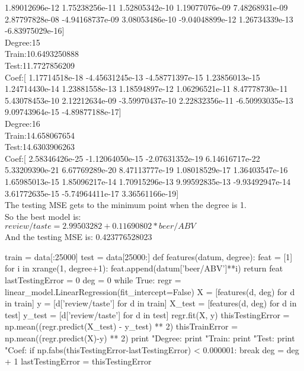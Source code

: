 \documentclass [11pt, a4paper, oneside] {article}
\begin{document}
   1.89012696e-12   1.75238256e-11   1.52805342e-10   1.19077076e-09
   7.48268931e-09   2.87797828e-08  -4.94168737e-09   3.08053486e-10
  -9.04048899e-12   1.26734339e-13  -6.83975029e-16]\\
Degree:15\\
Train:10.6493250888\\
Test:11.7727856209\\
Coef:[  1.17714518e-18  -4.45631245e-13  -4.58771397e-15   1.23856013e-15
   1.24714430e-14   1.23881558e-13   1.18594897e-12   1.06296521e-11
   8.47778730e-11   5.43078453e-10   2.12212634e-09  -3.59970437e-10
   2.22832356e-11  -6.50993035e-13   9.09743964e-15  -4.89877188e-17]\\
Degree:16\\
Train:14.658067654\\
Test:14.6303906263\\
Coef:[  2.58346426e-25  -1.12064050e-15  -2.07631352e-19   6.14616717e-22
   5.33209390e-21   6.67769289e-20   8.47113777e-19   1.08018529e-17
   1.36403547e-16   1.65985013e-15   1.85096217e-14   1.70915296e-13
   9.99592835e-13  -9.93492947e-14   3.61772635e-15  -5.74964411e-17
   3.36561166e-19]\\
The testing MSE gets to the minimum point when the degree is 1.\\
So the best model is:\\
$review/taste = 2.99503282 + 0.11690802*beer/ABV$\\
And the testing MSE is: 0.423776528023\\
\begin {python}
train = data[:25000]
test = data[25000:]
def features(datum, degree):
    feat = [1]
    for i in xrange(1, degree+1):
        feat.append(datum['beer/ABV']**i)
    return feat
lastTestingError = 0
deg = 0
while True:
    regr = linear_model.LinearRegression(fit_intercept=False)
    X = [features(d, deg) for d in train]
    y = [d['review/taste'] for d in train]
    X_test = [features(d, deg) for d in test]
    y_test = [d['review/taste'] for d in test]
    regr.fit(X, y)
    thisTestingError = np.mean((regr.predict(X_test) - y_test) ** 2)
    thisTrainError = np.mean((regr.predict(X)-y) ** 2)
    print "Degree:%
    print "Train:%
    print "Test:%
    print "Coef:%
    if np.fabs(thisTestingError-lastTestingError) < 0.000001:
        break
    deg = deg + 1
    lastTestingError = thisTestingError
\end{python}
\end{document}
